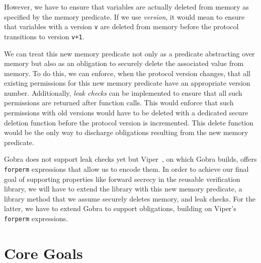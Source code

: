 \documentclass{article}
\begin{document}
However, we have to ensure that variables are actually deleted from memory as specified by the memory predicate. If we use \emph{version}, it would mean to ensure that variables with a version \texttt{v} are deleted from memory before the protocol transitions to version \texttt{v+1}.

We can treat this new memory predicate not only as a predicate abstracting over memory but also as an obligation to securely delete the associated value from memory. %
To do this, we can enforce, when the protocol version changes, that all existing permissions for this new memory predicate have an appropriate version number.
Additionally, \emph{leak checks} can be implemented
to ensure that all such permissions are returned after function calls.
This would enforce that such permissions with old versions would have to be deleted with a dedicated secure deletion function before the protocol version is incremented. This delete function would be the only way to discharge obligations resulting from the new memory predicate.

Gobra does not support leak checks yet but Viper~\cite{muller2016viper}, on which Gobra builds, offers \texttt{forperm} expressions that allow us to encode them.
In order to achieve our final goal of supporting properties like forward secrecy in the reusable verification library, we will have to extend the library with this new memory predicate, a library method that we assume securely deletes memory, and leak checks. For the latter, we have to extend Gobra to support obligations, building on Viper's \texttt{forperm} expressions.


\section{Core Goals}
\end{document}
